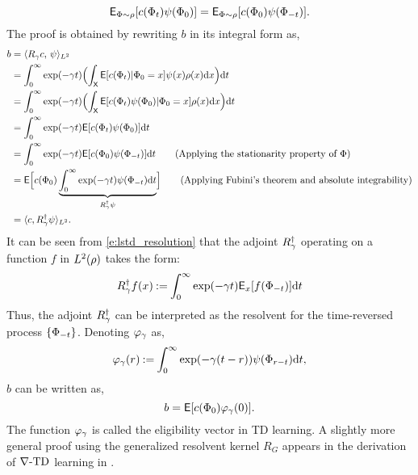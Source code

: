 \begin{equation}
{\sf E}_{\Phi \sim \rho}[c(\Phi_t) \psi(\Phi_0)] = {\sf E}_{\Phi \sim \rho} [c(\Phi_0) \psi(\Phi_{-t})].
\end{equation} 
The proof is obtained by rewriting $b$ in its integral form as,
\begin{equation}
\begin{aligned}
b & = \langle R_\discount c, \, \basis \rangle_{L^2} \\
& = \int_0^\infty \exp(-\discount t)  \Bigl(\int_{\state} \Expect[c(\markovstate_t)| \markovstate_0 = x] \basis(x)  \pr(x) \ud x \Bigr) \ud t \\
& = \int_0^\infty \exp(-\discount t)  \Bigl(\int_{\state} \Expect[c(\markovstate_t) \basis(\markovstate_0)| \markovstate_0 = x]  \pr(x) \ud x \Bigr) \ud t \\
& = \int_0^\infty \exp(-\discount t) \Expect[c(\markovstate_t) \basis(\markovstate_0)]\ud t \\
& = \int_0^\infty \exp(-\discount t) \Expect[c(\markovstate_0) \basis(\markovstate_{-t})] \ud t \qquad \text{(Applying the stationarity property of $\markovstate$)}\\
& = \Expect\Bigl[c(\markovstate_0) \underbrace{\int_0^\infty \exp(-\discount t) \basis(\markovstate_{-t})\ud t}_{R^\dagger_\discount \basis}\Bigr]  \qquad \text{(Applying Fubini's theorem and absolute integrability)}\\
& = \langle c, R^\dagger_\discount \basis \rangle_{L^2}.
\label{e:lstd_resolution}
\end{aligned}
\end{equation}
It can be seen from \eqref{e:lstd_resolution} that the adjoint $R^\dagger_\gamma$ operating on a function $f$ in $L^2(\rho)$ takes the form:
\begin{equation}
R^\dagger_\discount f(x) \eqdef \int_0^\infty \exp(-\discount t ) \Expect_x[f(\markovstate_{-t})] \ud t %
\end{equation}
Thus, the adjoint $R^\dagger_\gamma$ can be interpreted as the resolvent for the time-reversed process $\{\Phi_{-t}\}$. 
Denoting $\varphi_\gamma$ as,
\begin{equation}
\eligibvector_\discount(r) \eqdef \int_0^\infty \exp(-\discount (t -r)) \basis(\markovstate_{r-t}) \ud t,
\label{e:lstd_eligib}
\end{equation}
$b$ can be written as,
\begin{equation}
b = \Expect[c(\markovstate_0) \eligibvector_\discount(0)].
\label{e:lstd_b}
\end{equation}
The function $\varphi_\gamma$ is called the eligibility vector in TD learning. A slightly more general proof using the generalized resolvent kernel $R_G$ appears in the derivation of $\nabla\text{-TD}$ learning in .

